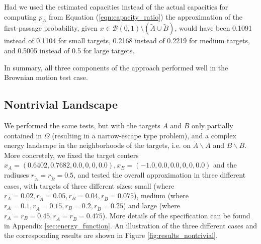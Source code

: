 \documentclass[12pt, nofootinbib,english, amsmath, amssymb, aps, priprint, graphicx,floatfix]{revtex4-1}
\theoremstyle{plain}
\theoremstyle{definition}
\theoremstyle{plain}
\newcommand{\dA}{{\dot A}}
\newcommand{\tA}{{\tilde A}}
\newcommand{\dB}{{\dot B}}
\newcommand{\tB}{{\tilde B}}
\begin{document}
Had we used the estimated capacities instead of the actual capacities for computing  $p_A$ from Equation
(\ref{eqn:capacity_ratio}) the approximation of the first-passage probability, given $x\in\mathcal{B}(0, 1) \setminus (\tilde{A} \cup \tilde{B})$, would have been 0.1091 instead of 0.1104 for small targets, 0.2168 instead of 0.2219 for medium targets, and 0.5005 instead of 0.5 for large targets.

In summary, all three components of the approach performed well in the Brownian motion test case.


\begin{figure}
\end{figure}

\subsection{Nontrivial Landscape}\label{sec:nontrivial_results}
We performed the same tests, but with the targets $A$ and $B$ only partially contained in $\Omega$ (resulting in a narrow-escape type problem), and a complex energy landscape in the neighborhoods of the targets, i.e. on $\dA\backslash A$ and $\dB\backslash B$. More concretely, we fixed the target centers $x_A=(0.6402,0.7682,0.0,0,0,0.0), x_B=(-1.0,0.0,0.0,0,0,0.0)$ and the radiuses $r_\tA=r_\tB=0.5$, and tested the overall approximation in three different cases, with targets of three different sizes: small (where $r_A=0.02, r_\dA=0.05, r_B=0.04, r_\dB=0.075$), medium (where $r_A=0.1, r_\dA=0.15, r_B=0.2, r_\dB=0.25$) and large (where $r_A=r_B=0.45, r_\dA=r_\dB=0.475$). More details of the specification can be found in Appendix \ref{sec:energy_function}. An illustration of the three different cases and the corresponding results are shown in Figure \ref{fig:results_nontrivial}.
\end{document}
